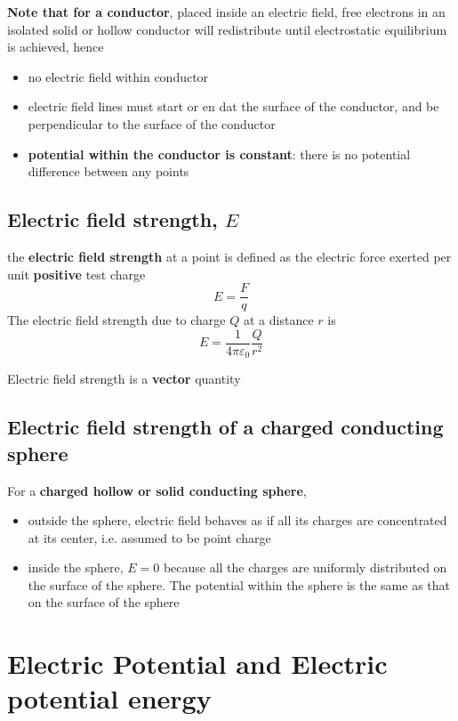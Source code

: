 \documentclass[a4paper, 10pt]{article}
\begin{document}
\textbf{Note that for a conductor}, placed inside an electric field, free electrons in an isolated solid or hollow conductor will redistribute until electrostatic equilibrium is achieved, hence
\begin{itemize}
   \item no electric field within conductor
   \item electric field lines must start or en dat the surface of the conductor, and be perpendicular to the surface of the conductor
   \item \textbf{potential within the conductor is constant}: there is no potential difference between any points
\end{itemize}	

\subsection{Electric field strength, $E$}
\begin{framed}
   the \textbf{electric field strength} at a point is defined as the electric force exerted per unit \textbf{positive} test charge 
   \[
   E = \frac{F}{q}
   \]
   The electric field strength due to charge $Q$ at a distance $r$ is 
   \[
      E = \frac{1}{4 \pi\varepsilon_0} \frac{Q}{r^2} 
   \]
   
   Electric field strength is a \textbf{vector} quantity
\end{framed}	

\subsection{Electric field strength of a charged conducting sphere}
For a \textbf{charged hollow or solid conducting sphere}, 
\begin{itemize}
   \item outside the sphere, electric field behaves as if all its charges are concentrated at its center, i.e. assumed to be point charge
   \item inside the sphere, $E = 0$  because all the charges are uniformly distributed on the surface of the sphere. The potential within the sphere is the same as that on the surface of the sphere
\end{itemize}	


\section{Electric Potential and Electric potential energy}
\end{document}

